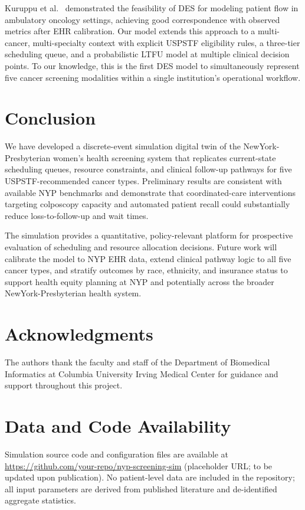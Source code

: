 \documentclass[12pt]{article}
\begin{document}
Kuruppu et al.~\cite{kuruppu2025} demonstrated the feasibility of DES
for modeling patient flow in ambulatory oncology settings, achieving
good correspondence with observed metrics after EHR calibration.
Our model extends this approach to a multi-cancer, multi-specialty
context with explicit USPSTF eligibility rules, a three-tier scheduling
queue, and a probabilistic LTFU model at multiple clinical decision
points.
To our knowledge, this is the first DES model to simultaneously
represent five cancer screening modalities within a single institution's
operational workflow.

\section{Conclusion}

We have developed a discrete-event simulation digital twin of the
NewYork-Presbyterian women's health screening system that replicates
current-state scheduling queues, resource constraints, and clinical
follow-up pathways for five USPSTF-recommended cancer types.
Preliminary results are consistent with available NYP benchmarks and
demonstrate that coordinated-care interventions targeting colposcopy
capacity and automated patient recall could substantially reduce
loss-to-follow-up and wait times.

The simulation provides a quantitative, policy-relevant platform for
prospective evaluation of scheduling and resource allocation decisions.
Future work will calibrate the model to NYP EHR data, extend clinical
pathway logic to all five cancer types, and stratify outcomes by race,
ethnicity, and insurance status to support health equity planning at
NYP and potentially across the broader NewYork-Presbyterian health
system.

\section*{Acknowledgments}

The authors thank the faculty and staff of the Department of Biomedical
Informatics at Columbia University Irving Medical Center for guidance
and support throughout this project.

\section*{Data and Code Availability}

Simulation source code and configuration files are available at
\url{https://github.com/your-repo/nyp-screening-sim} (placeholder URL;
to be updated upon publication).
No patient-level data are included in the repository; all input
parameters are derived from published literature and de-identified
aggregate statistics.



\end{document}
